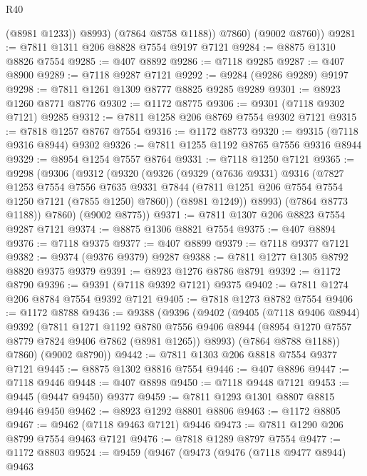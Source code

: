 \begin{lexlean}{R40}
\begin{coremodule}
              (@8981 @1233))
            @8993)
          (@7864 @8758 @1188))
        @7860)
      (@9002 @8760))
@9281 := @7811 @1311 @206 @8828 @7554 @9197 @7121
@9284 := @8875 @1310 @8826 @7554
@9285 := @407 @8892
@9286 := @7118 @9285
@9287 := @407 @8900
@9289 := @7118 @9287 @7121
@9292 := @9284 (@9286 @9289) @9197
@9298 := @7811 @1261 @1309 @8777 @8825 @9285 @9289
@9301 := @8923 @1260 @8771 @8776
@9302 := @1172 @8775
@9306 := @9301 (@7118 @9302 @7121) @9285
@9312 := @7811 @1258 @206 @8769 @7554 @9302 @7121
@9315 := @7818 @1257 @8767 @7554
@9316 := @1172 @8773
@9320 := @9315 (@7118 @9316 @8944) @9302
@9326 := @7811 @1255 @1192 @8765 @7556 @9316 @8944
@9329 := @8954 @1254 @7557 @8764
@9331 := @7118 @1250 @7121
@9365 := @9298
    (@9306
      (@9312
        (@9320
          (@9326
            (@9329
              (@7636 @9331)
              @9316
              (@7827
                @1253
                @7554
                @7556
                @7635
                @9331
                @7844
                (@7811 @1251 @206 @7554 @7554 @1250 @7121 (@7855 @1250) @7860))
              (@8981 @1249))
            @8993)
          (@7864 @8773 @1188))
        @7860)
      (@9002 @8775))
@9371 := @7811 @1307 @206 @8823 @7554 @9287 @7121
@9374 := @8875 @1306 @8821 @7554
@9375 := @407 @8894
@9376 := @7118 @9375
@9377 := @407 @8899
@9379 := @7118 @9377 @7121
@9382 := @9374 (@9376 @9379) @9287
@9388 := @7811 @1277 @1305 @8792 @8820 @9375 @9379
@9391 := @8923 @1276 @8786 @8791
@9392 := @1172 @8790
@9396 := @9391 (@7118 @9392 @7121) @9375
@9402 := @7811 @1274 @206 @8784 @7554 @9392 @7121
@9405 := @7818 @1273 @8782 @7554
@9406 := @1172 @8788
@9436 := @9388
    (@9396
      (@9402
        (@9405
          (@7118 @9406 @8944)
          @9392
          (@7811
            @1271
            @1192
            @8780
            @7556
            @9406
            @8944
            (@8954 @1270 @7557 @8779 @7824 @9406 @7862 (@8981 @1265))
            @8993)
          (@7864 @8788 @1188))
        @7860)
      (@9002 @8790))
@9442 := @7811 @1303 @206 @8818 @7554 @9377 @7121
@9445 := @8875 @1302 @8816 @7554
@9446 := @407 @8896
@9447 := @7118 @9446
@9448 := @407 @8898
@9450 := @7118 @9448 @7121
@9453 := @9445 (@9447 @9450) @9377
@9459 := @7811 @1293 @1301 @8807 @8815 @9446 @9450
@9462 := @8923 @1292 @8801 @8806
@9463 := @1172 @8805
@9467 := @9462 (@7118 @9463 @7121) @9446
@9473 := @7811 @1290 @206 @8799 @7554 @9463 @7121
@9476 := @7818 @1289 @8797 @7554
@9477 := @1172 @8803
@9524 := @9459
    (@9467
      (@9473
        (@9476
          (@7118 @9477 @8944)
          @9463

\end{coremodule}
\end{lexlean}
